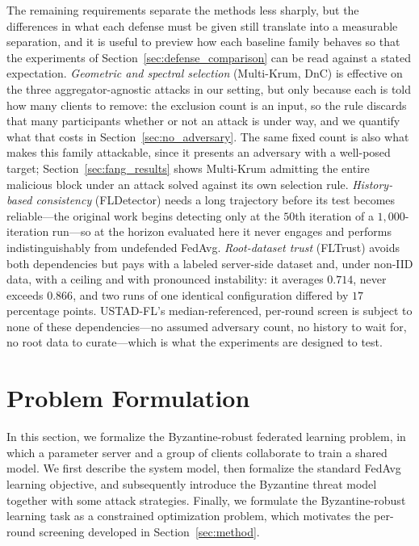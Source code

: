 \documentclass[journal]{IEEEtran}
\begin{document}
The remaining requirements separate the methods less sharply, but the differences in what each defense must be given still translate into a measurable separation, and it is useful to preview how each baseline family behaves so that the experiments of Section~\ref{sec:defense_comparison} can be read against a stated expectation. \emph{Geometric and spectral selection} (Multi-Krum, DnC) is effective on the three aggregator-agnostic attacks in our setting, but only because each is told how many clients to remove: the exclusion count is an input, so the rule discards that many participants whether or not an attack is under way, and we quantify what that costs in Section~\ref{sec:no_adversary}. The same fixed count is also what makes this family attackable, since it presents an adversary with a well-posed target; Section~\ref{sec:fang_results} shows Multi-Krum admitting the entire malicious block under an attack solved against its own selection rule. \emph{History-based consistency} (FLDetector) needs a long trajectory before its test becomes reliable---the original work begins detecting only at the $50$th iteration of a $1{,}000$-iteration run---so at the horizon evaluated here it never engages and performs indistinguishably from undefended FedAvg. \emph{Root-dataset trust} (FLTrust) avoids both dependencies but pays with a labeled server-side dataset and, under non-IID data, with a ceiling and with pronounced instability: it averages $0.714$, never exceeds $0.866$, and two runs of one identical configuration differed by $17$ percentage points. USTAD-FL's median-referenced, per-round screen is subject to none of these dependencies---no assumed adversary count, no history to wait for, no root data to curate---which is what the experiments are designed to test.

\section{Problem Formulation}
\label{sec:formulation}

In this section, we formalize the Byzantine-robust federated learning problem, in which a parameter server and a group of clients collaborate to train a shared model. We first describe the system model, then formalize the standard FedAvg learning objective, and subsequently introduce the Byzantine threat model together with some attack strategies. Finally, we formulate the Byzantine-robust learning task as a constrained optimization problem, which motivates the per-round screening developed in Section~\ref{sec:method}.
\end{document}
